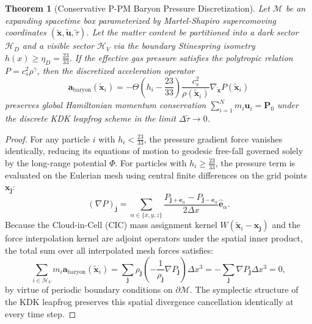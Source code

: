 \documentclass[11pt,letterpaper]{article}
\theoremstyle{plain}
\newtheorem{theorem}{Theorem}
\begin{document}
\begin{theorem}[Conservative P-PM Baryon Pressure Discretization]
\label{thm:ppm_pressure}
Let $\mathcal{M}$ be an expanding spacetime box parameterized by
Martel-Shapiro supercomoving coordinates
$(\tilde{\mathbf{x}}, \tilde{\mathbf{u}}, \tilde{\tau})$.
Let the matter content be partitioned into a dark sector $\mathcal{H}_D$
and a visible sector $\mathcal{H}_V$ via the boundary Stinespring
isometry $h(x) \ge \eta_D = \frac{23}{33}$. If the effective gas
pressure satisfies the polytropic relation $P = c_s^2 \rho^\gamma$,
then the discretized acceleration operator
\begin{equation}
\mathbf{a}_{\mathrm{baryon}}(\tilde{\mathbf{x}}_i) =
-\Theta\left(h_i - \frac{23}{33}\right) \frac{c_s^2}{\rho(\tilde{\mathbf{x}}_i)}
\nabla_{\tilde{\mathbf{x}}} P(\tilde{\mathbf{x}}_i)
\end{equation}
preserves global Hamiltonian momentum conservation
$\sum_{i=1}^N m_i \mathbf{u}_i = \mathbf{P}_0$ under the discrete KDK
leapfrog scheme in the limit $\Delta \tilde{\tau} \to 0$.
\end{theorem}

\begin{proof}
For any particle $i$ with $h_i < \frac{23}{33}$, the pressure gradient
force vanishes identically, reducing its equations of motion to
geodesic free-fall governed solely by the long-range potential $\Phi$.
For particles with $h_i \ge \frac{23}{33}$, the pressure term is
evaluated on the Eulerian mesh using central finite differences on the
grid points $\mathbf{x}_{\mathbf{j}}$:
\begin{equation}
(\nabla P)_{\mathbf{j}} = \sum_{\alpha \in \{x,y,z\}}
\frac{P_{\mathbf{j}+\mathbf{e}_\alpha} - P_{\mathbf{j}-\mathbf{e}_\alpha}}
{2 \Delta x} \hat{\mathbf{e}}_\alpha.
\end{equation}
Because the Cloud-in-Cell (CIC) mass assignment kernel
$W(\tilde{\mathbf{x}}_i - \mathbf{x}_{\mathbf{j}})$ and the force
interpolation kernel are adjoint operators under the spatial inner
product, the total sum over all interpolated mesh forces satisfies:
\begin{equation}
\sum_{i \in \mathcal{H}_V} m_i \mathbf{a}_{\mathrm{baryon}}(\tilde{\mathbf{x}}_i) =
\sum_{\mathbf{j}} \rho_{\mathbf{j}} \left(-\frac{1}{\rho_{\mathbf{j}}}
\nabla P_{\mathbf{j}}\right) \Delta x^3 =
-\sum_{\mathbf{j}} \nabla P_{\mathbf{j}} \Delta x^3 = 0,
\end{equation}
by virtue of periodic boundary conditions on $\partial \mathcal{M}$.
The symplectic structure of the KDK leapfrog preserves this spatial
divergence cancellation identically at every time step.
\end{proof}
\end{document}
